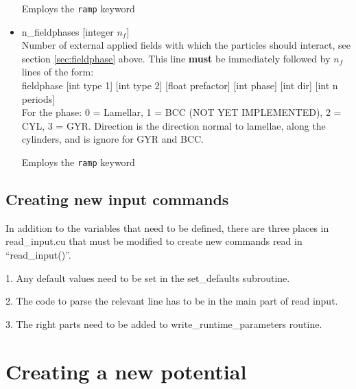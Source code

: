 \documentclass[12pt]{article}
\begin{document}
\begin{itemize}
	Employs the \verb+ramp+ keyword
	
  \item
    n\_fieldphases [integer $n_f$]
    \\[8pt]
    Number of external applied fields with which the particles should interact, see section \ref{sec:fieldphase} above. This line {\bf must} be immediately followed by $n_f$ lines of the form:
    \\[8pt]
    fieldphase [int type 1] [int type 2] [float prefactor] [int phase] [int dir] [int n periods]
    \\[8pt]
    For the phase: 0 = Lamellar, 1 = BCC (NOT YET IMPLEMENTED), 2 = CYL, 3 = GYR. Direction is the direction normal to lamellae, along the cylinders, and is ignore for GYR and BCC.

	Employs the \verb+ramp+ keyword
\end{itemize}

\subsection{Creating new input commands}

In addition to the variables that need to be defined, there are three places in read\_input.cu that must be modified to create new commands read in ``read\_input()''. 

1. Any default values need to be set in the set\_defaults subroutine.

2. The code to parse the relevant line has to be in the main part of read input.

3. The right parts need to be added to write\_runtime\_parameters routine.








\pagebreak
\section{Creating a new potential}
\end{document}
